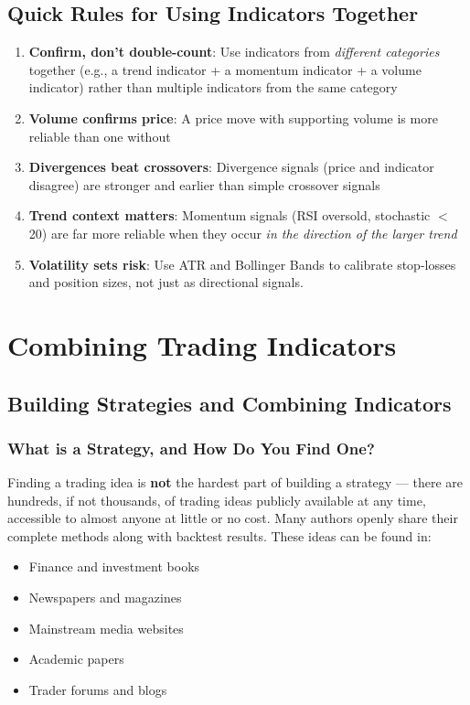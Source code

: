 \documentclass[12pt,openany]{book}
\begin{document}
\subsection{Quick Rules for Using Indicators Together}

\begin{enumerate}[leftmargin=*]
    \item \textbf{Confirm, don't double-count}: Use indicators from \emph{different categories} together (e.g., a trend indicator + a momentum indicator + a volume indicator) rather than multiple indicators from the same category
    \item \textbf{Volume confirms price}: A price move with supporting volume is more reliable than one without
    \item \textbf{Divergences beat crossovers}: Divergence signals (price and indicator disagree) are stronger and earlier than simple crossover signals
    \item \textbf{Trend context matters}: Momentum signals (RSI oversold, stochastic \(<\) 20) are far more reliable when they occur \emph{in the direction of the larger trend}
    \item \textbf{Volatility sets risk}: Use ATR and Bollinger Bands to calibrate stop-losses and position sizes, not just as directional signals.
\end{enumerate}

\section{Combining Trading 
Indicators}

\subsection{Building Strategies and Combining Indicators}

\subsubsection{What is a Strategy, and How Do You Find One?}

Finding a trading idea is \textbf{not} the hardest part of building a strategy --- there are hundreds, if not thousands, of trading ideas publicly available at any time, accessible to almost anyone at little or no cost. Many authors openly share their complete methods along with backtest results. These ideas can be found in:
\begin{itemize}[leftmargin=*]
    \item Finance and investment books
    \item Newspapers and magazines
    \item Mainstream media websites
    \item Academic papers
    \item Trader forums and blogs
\end{itemize}
\end{document}
